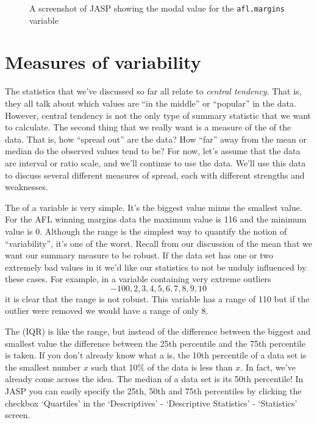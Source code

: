 \vspace{0.5cm}
\begin{figure}[!!htb]
\begin{center}
\caption{A screenshot of JASP showing the modal value for the \texttt{afl.margins} variable }
\label{fig:aflsmall_margins_mode}
\HR
\end{center}
\end{figure}


\section{Measures of variability\label{sec:var}}

The statistics that we've discussed so far all relate to {\it central tendency}. That is, they all talk about which values are ``in the middle'' or ``popular'' in the data. However, central tendency is not the only type of summary statistic that we want to calculate. The second thing that we really want is a measure of the  of the data. That is, how ``spread out'' are the data? How ``far'' away from the mean or median do the observed values tend to be? For now, let's assume that the data are interval or ratio scale, and we'll continue to use the  data.  We'll use this data to discuss several different measures of spread, each with different strengths and weaknesses. 


The  of a variable is very simple. It's the biggest value minus the smallest value. For the AFL winning margins data the maximum value is 116 and the minimum value is 0. Although the range is the simplest way to quantify the notion of ``variability'', it's one of the worst. Recall from our discussion of the mean that we want our summary measure to be robust. If the data set has one or two extremely bad values in it we'd like our statistics to not be unduly influenced by these cases. For example, in a variable containing very extreme outliers 
$$
-100,2,3,4,5,6,7,8,9,10
$$
it is clear that the range is not robust. This variable has a range of 110 but if the outlier were removed we would have a range of only 8.


The  (IQR) is like the range, but instead of the difference between the biggest and smallest value the difference between the 25th percentile and the 75th percentile is taken. If you don't already know what a  is, the 10th percentile of a data set is the smallest number $x$ such that 10\% of the data is less than $x$. In fact, we've already come across the idea. The median of a data set is its 50th percentile! In JASP you can easily specify the 25th, 50th and 75th percentiles by clicking the checkbox `Quartiles' in the `Descriptives' - `Descriptive Statistics' - `Statistics' screen. 

